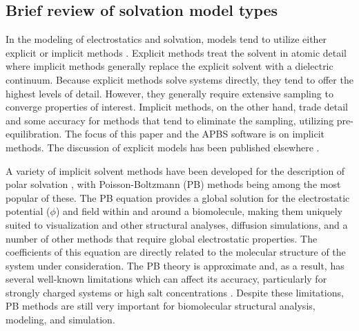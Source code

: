 \documentclass[journal=jpcbfk, manuscript=article]{achemso}
\begin{document}
\subsection{Brief review of solvation model types}
In the modeling of electrostatics and solvation, models tend to utilize either explicit or implicit methods \cite{Ren:2012, Roux:1999, Warshel:2006}. Explicit methods treat the solvent in atomic detail where implicit methods generally replace the explicit solvent with a dielectric continuum. Because explicit methods solve systems directly, they tend to offer the highest levels of detail. However, they generally require extensive sampling to converge properties of interest. Implicit methods, on the other hand, trade detail and some accuracy for methods that tend to eliminate the sampling, utilizing pre-equilibration. The focus of this paper and the APBS software is on implicit methods. The discussion of explicit models has been published elsewhere \cite{Ren:2012}. 

A variety of implicit solvent methods have been developed for the description of polar solvation \cite{Ren:2012}, with Poisson-Boltzmann (PB) methods being among the most popular of these. The PB equation \cite{Fixman:1979, Grochowski:2008, Lamm:2003} provides a global solution for the electrostatic potential ($\phi$) and field within and around a biomolecule, making them uniquely suited to visualization and other structural analyses, diffusion simulations, and a number of other methods that require global electrostatic properties. The coefficients of this equation are directly related to the molecular structure of the system under consideration. The PB theory is approximate and, as a result, has several well-known limitations which can affect its accuracy, particularly for strongly charged systems or high salt concentrations \cite{Fixman:1979, Netz:2000}. Despite these limitations, PB methods are still very important for biomolecular structural analysis, modeling, and simulation.
\end{document}
